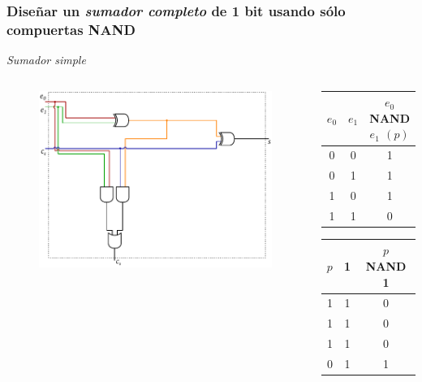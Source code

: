 \documentclass[mathserif,hyperref]{beamer}
\begin{document}
\begin{frame}[t]
\frametitle{\small Diseñar un \textit{sumador completo} de 1 bit usando sólo
compuertas NAND}
\textit{Sumador simple}
\begin{columns}[T]
  \begin{figure}[htp]
    \includegraphics[scale=0.6]{sumador-completo.pdf}
  \end{figure}

  \begin{center}
  \begin{tabular}{| c | c || c |}
    \hline
    $e_0$ & $e_1$ & $e_0$ NAND $e_1$ $(p)$ \\ \hline
      0   &   0   &            1           \\
      0   &   1   &            1           \\
      1   &   0   &            1           \\
      1   &   1   &            0           \\
    \hline
  \end{tabular}
  \pause
  \begin{tabular}{| c | c || c |}
    \hline
    $p$ & 1 & $p$ NAND 1 \\ \hline
     1  & 1 &      0     \\
     1  & 1 &      0     \\
     1  & 1 &      0     \\
     0  & 1 &      1     \\
    \hline
  \end{tabular}
  \end{center}
\end{columns}
\end{frame}
\end{document}
